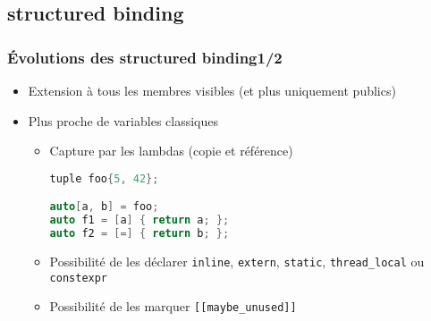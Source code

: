 \documentclass[C++.tex]{subfiles}
\begin{document}
\subsection*{structured binding}
\begin{frame}[fragile]
	\frametitle{Évolutions des structured binding\titlehfill{}1/2}
	\begin{itemize}
		\item Extension à tous les membres visibles (et plus uniquement publics)

	
		\item Plus proche de variables \og classiques\fg{}
		\begin{itemize}
			\item Capture par les lambdas (copie et référence)


		\begin{lstlisting}[language=C++]
tuple foo{5, 42};

auto[a, b] = foo;
auto f1 = [a] { return a; };
auto f2 = [=] { return b; };\end{lstlisting}

			\item Possibilité de les déclarer \lstinline|inline|, \lstinline|extern|, \lstinline|static|, \lstinline|thread_local| ou \lstinline|constexpr|
			\item Possibilité de les marquer \lstinline|[[maybe_unused]]|
		\end{itemize}
	\end{itemize}
\end{frame}
\end{document}
